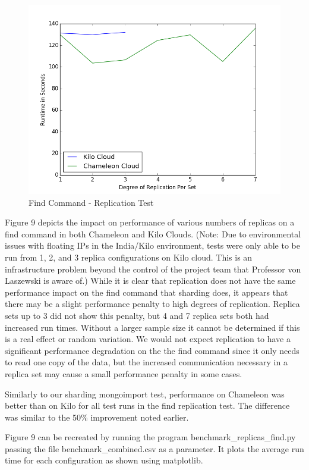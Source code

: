 \documentclass[9pt,twocolumn,twoside]{../../styles/osajnl}
\begin{document}
\begin{figure}[!ht]
  \includegraphics[scale=0.45]{images/replica_find.png}
  \caption{Find Command - Replication Test}
\end{figure}


Figure 9 depicts the impact on performance of various numbers of replicas on a find command in both Chameleon and Kilo Clouds.  (Note: Due to environmental issues with floating IPs in the India/Kilo environment, tests were only able to be run from 1, 2, and 3 replica configurations on Kilo cloud.  This is an infrastructure problem beyond the control of the project team that Professor von Laszewski is aware of.)  While it is clear that replication does not have the same performance impact on the find command that sharding does, it appears that there may be a slight performance penalty to high degrees of replication.  Replica sets up to 3 did not show this penalty, but 4 and 7 replica sets both had increased run times.  Without a larger sample size it cannot be determined if this is a real effect or random variation.  We would not expect replication to have a significant performance degradation on the the find command since it only needs to read one copy of the data, but the increased communication necessary in a replica set may cause a small performance penalty in some cases.

Similarly to our sharding mongoimport test, performance on Chameleon was better than on Kilo for all test runs in the find replication test.  The difference was similar to the 50\% improvement noted earlier.

Figure 9 can be recreated by running the program benchmark\_replicas\_find.py passing the file benchmark\_combined.csv as a parameter.  It plots the average run time for each configuration as shown using matplotlib.
\end{document}
